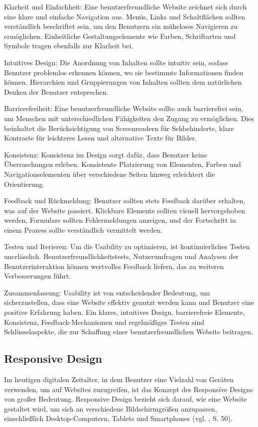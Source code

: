 \documentclass[fontsize=12pt,openright,oneside,paper=a4,BCOR=1cm]{scrbook}
\begin{document}
Klarheit und Einfachheit: Eine benutzerfreundliche Website zeichnet sich durch eine klare und einfache Navigation aus. Menüs, Links und Schaltflächen sollten verständlich beschriftet sein, um den Benutzern ein müheloses Navigieren zu ermöglichen. Einheitliche Gestaltungselemente wie Farben, Schriftarten und Symbole tragen ebenfalls zur Klarheit bei.

Intuitives Design: Die Anordnung von Inhalten sollte intuitiv sein, sodass Benutzer problemlos erkennen können, wo sie bestimmte Informationen finden können. Hierarchien und Gruppierungen von Inhalten sollten dem natürlichen Denken der Benutzer entsprechen.

Barrierefreiheit: Eine benutzerfreundliche Website sollte auch barrierefrei sein, um Menschen mit unterschiedlichen Fähigkeiten den Zugang zu ermöglichen. Dies beinhaltet die Berücksichtigung von Screenreadern für Sehbehinderte, klare Kontraste für leichteres Lesen und alternative Texte für Bilder.

Konsistenz: Konsistenz im Design sorgt dafür, dass Benutzer keine Überraschungen erleben. Konsistente Platzierung von Elementen, Farben und Navigationselementen über verschiedene Seiten hinweg erleichtert die Orientierung.

Feedback und Rückmeldung: Benutzer sollten stets Feedback darüber erhalten, was auf der Website passiert. Klickbare Elemente sollten visuell hervorgehoben werden, Formulare sollten Fehlermeldungen anzeigen, und der Fortschritt in einem Prozess sollte verständlich vermittelt werden.

Testen und Iterieren: Um die Usability zu optimieren, ist kontinuierliches Testen unerlässlich. Benutzerfreundlichkeitstests, Nutzerumfragen und Analysen der Benutzerinteraktion können wertvolles Feedback liefern, das zu weiteren Verbesserungen führt.

Zusammenfassung:
Usability ist von entscheidender Bedeutung, um sicherzustellen, dass eine Website effektiv genutzt werden kann und Benutzer eine positive Erfahrung haben. Ein klares, intuitives Design, barrierefreie Elemente, Konsistenz, Feedback-Mechanismen und regelmäßiges Testen sind Schlüsselaspekte, die zur Schaffung einer benutzerfreundlichen Website beitragen.





\subsection{Responsive Design}
Im heutigen digitalen Zeitalter, in dem Benutzer eine Vielzahl von Geräten verwenden, um auf Websites zuzugreifen, ist das Konzept des Responsive Designs von großer Bedeutung. Responsive Design bezieht sich darauf, wie eine Website gestaltet wird, um sich an verschiedene Bildschirmgrößen anzupassen, einschließlich Desktop-Computern, Tablets und Smartphones (vgl. \cite{almeida2017role}, S. 50).	\\
\end{document}
